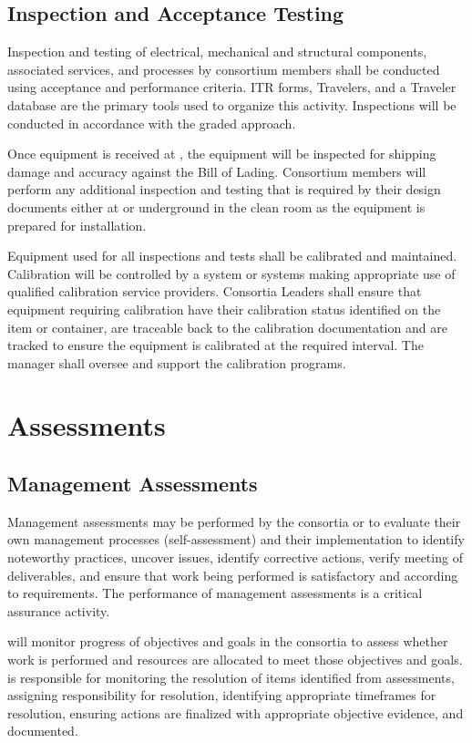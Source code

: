 \subsection{Inspection and Acceptance Testing}

Inspection and testing of electrical, mechanical and structural
components, associated services, and processes by consortium members
shall be conducted using acceptance and performance criteria. ITR
forms, Travelers, and a Traveler database are the primary tools used
to organize this activity. Inspections will be conducted in accordance
with the graded approach.

Once equipment is received at , the equipment will 
be inspected for shipping damage and accuracy against the Bill of Lading. 
Consortium members will perform any additional inspection and testing that 
is required by their design documents either at  or 
underground in the clean room as the equipment is prepared for 
installation.

Equipment used for all inspections and tests shall be calibrated and
maintained. Calibration will be controlled by a system or systems
making appropriate use of qualified calibration service
providers. Consortia Leaders shall ensure that equipment requiring
calibration have their calibration status identified on the item or
container, are traceable back to the calibration documentation and are
tracked to ensure the equipment is calibrated at the required
interval. The   manager shall
oversee and support the  calibration programs.

\section{Assessments}

\subsection{Management Assessments}

Management assessments may be performed by the consortia or 
to evaluate their own management processes (self-assessment) and their
implementation to identify noteworthy practices, uncover issues,
identify corrective actions, verify meeting of deliverables, and
ensure that work being performed is satisfactory and according to
requirements. The performance of management assessments is a critical
assurance activity.

  will monitor progress
of objectives and goals in the consortia to assess whether work is
performed and resources are allocated to meet those objectives and
goals.    is responsible for monitoring the
resolution of items identified from assessments, assigning
responsibility for resolution, identifying appropriate timeframes for
resolution, ensuring actions are finalized with appropriate objective
evidence, and documented.

